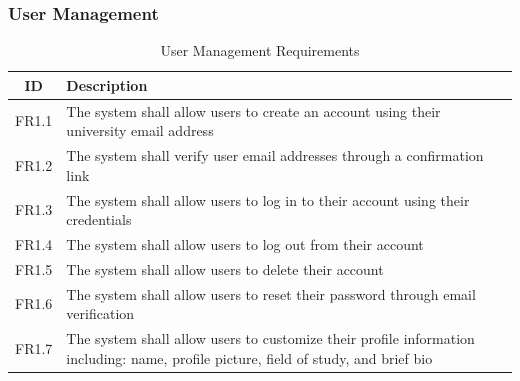 \documentclass{article}
\begin{document}
\subsubsection{User Management}
\begin{table}[h!]
    \centering
    \begin{tabular}{|c|p{10cm}|}
    \hline
    \textbf{ID} & \textbf{Description} \\
    \hline
    FR1.1 & The system shall allow users to create an account using their university email address \\
    FR1.2 & The system shall verify user email addresses through a confirmation link \\
    FR1.3 & The system shall allow users to log in to their account using their credentials \\
    FR1.4 & The system shall allow users to log out from their account \\
    FR1.5 & The system shall allow users to delete their account \\
    FR1.6 & The system shall allow users to reset their password through email verification \\
    FR1.7 & The system shall allow users to customize their profile information including: name, profile picture, field of study, and brief bio \\
    \hline
    \end{tabular}
    \caption{User Management Requirements}
    \label{tab: user_management}
\end{table}
\end{document}
